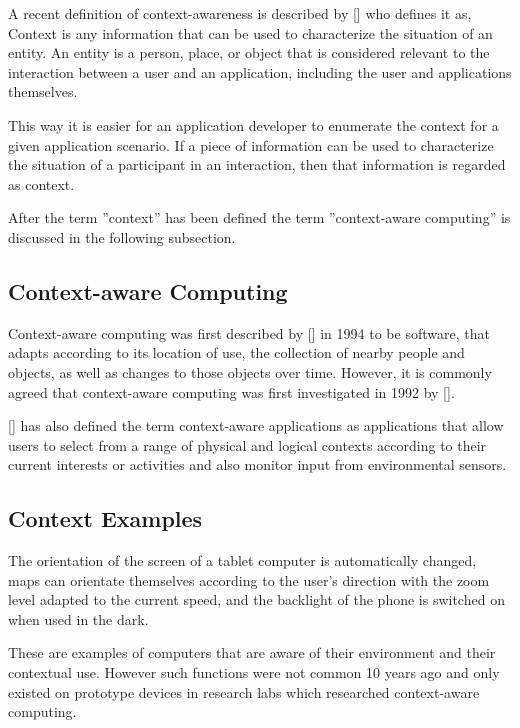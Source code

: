 A recent definition of context-awareness is described by [\citeauthor{Dey2000b}] who defines it as, Context is any information that can be used to characterize the situation of an entity. An entity is a person, place, or object that is considered relevant to the interaction between a user and an application, including the user and applications themselves. 

This way it is easier for an application developer to enumerate the context for a given application scenario. If a piece of information can be used to characterize the situation of a participant in an interaction, then that information is regarded as context.

After the term ''context'' has been defined the term ''context-aware computing'' is discussed in the following subsection.

\subsection{Context-aware Computing}
Context-aware computing was first described by [\citeauthor{ieee313011}] in 1994 to be software, that adapts according to its location of use, the collection of nearby people and objects, as well as changes to those objects over time. However, it is commonly agreed that context-aware computing was first investigated in 1992 by [\citeauthor{WantHFG92}]. 

[\citeauthor{RyanME}] has also defined the term context-aware applications as applications that allow users to select from a range of physical and logical contexts according to their current interests or activities and also monitor input from environmental sensors.


\subsection{Context Examples}
The orientation of the screen of a tablet computer is automatically changed, maps can orientate themselves according to the user's direction with the zoom level adapted to the current speed, and the backlight of the phone is switched on when used in the dark.

These are examples of computers that are aware of their environment and their contextual use. However such functions were not common 10 years ago and only existed on prototype devices in research labs which researched context-aware computing.
\\


